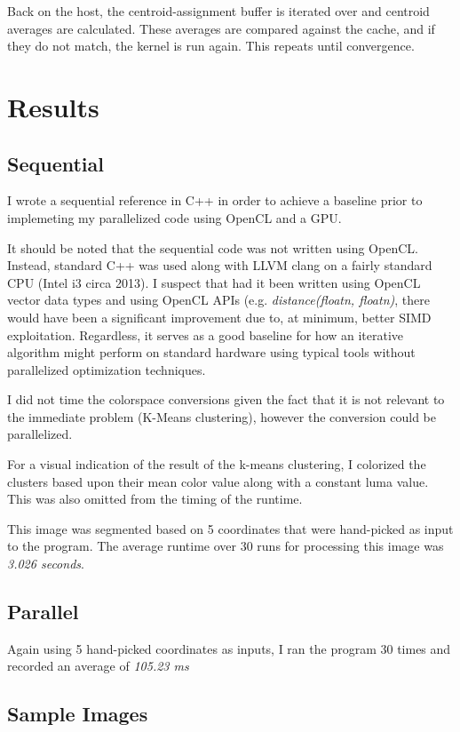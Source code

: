 \documentclass[11pt]{article}
\begin{document}
Back on the host, the centroid-assignment buffer is iterated over and centroid 
averages are calculated. These averages are compared against the cache, and if they
do not match, the kernel is run again. This repeats until convergence.

\section{Results}

\subsection{Sequential}

I wrote a sequential reference in C++ in order to achieve a baseline prior to implemeting
my parallelized code using OpenCL and a GPU.

It should be noted that the sequential code was not written using OpenCL. Instead, standard C++ 
was used along with LLVM clang on a fairly standard CPU (Intel i3 circa 2013). I suspect that 
had it been written using OpenCL vector data types and using OpenCL APIs (e.g. 
\textit{distance(floatn, floatn)}, there would  have been a significant improvement due to, 
at minimum, better SIMD exploitation. Regardless, it serves as a good baseline for how an 
iterative algorithm might perform on standard hardware using typical tools without parallelized
optimization techniques.

I did not time the colorspace conversions given the fact that it is not relevant to the
immediate problem (K-Means clustering), however the conversion could be parallelized.

For a visual indication of the result of the k-means clustering, I colorized the clusters
based upon their mean color value along with a constant luma value. This was also omitted
from the timing of the runtime.

This image was segmented based on 5 coordinates that were hand-picked as input to the program.
The average runtime over 30 runs for processing this image was \emph{3.026 seconds}.

\subsection{Parallel}

Again using 5 hand-picked coordinates as inputs, I ran the program 30 times and recorded an
average of \emph{105.23 ms}

\subsection{Sample Images}
\end{document}
